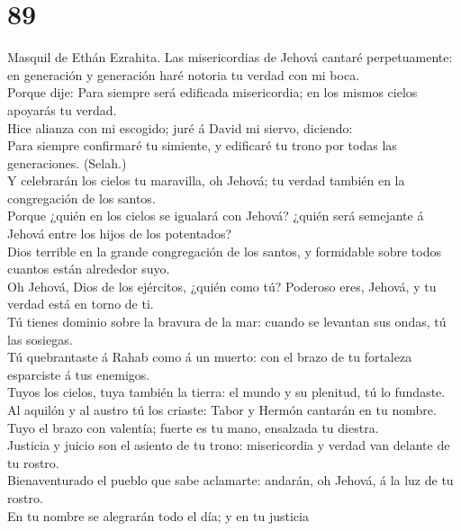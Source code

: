\hypertarget{section-19-89}{%
\section{89}\label{section-19-89}}

 Masquil de Ethán Ezrahita. Las misericordias de Jehová
cantaré perpetuamente: en generación y generación haré notoria tu verdad
con mi boca.\\
 Porque dije: Para siempre será edificada misericordia; en
los mismos cielos apoyarás tu verdad.\\
 Hice alianza con mi escogido; juré á David mi siervo,
diciendo:\\
 Para siempre confirmaré tu simiente, y edificaré tu trono
por todas las generaciones. (Selah.)\\
 Y celebrarán los cielos tu maravilla, oh Jehová; tu
verdad también en la congregación de los santos.\\
 Porque ¿quién en los cielos se igualará con Jehová?
¿quién será semejante á Jehová entre los hijos de los potentados?\\
 Dios terrible en la grande congregación de los santos, y
formidable sobre todos cuantos están alrededor suyo.\\
 Oh Jehová, Dios de los ejércitos, ¿quién como tú?
Poderoso eres, Jehová, y tu verdad está en torno de ti.\\
 Tú tienes dominio sobre la bravura de la mar: cuando se
levantan sus ondas, tú las sosiegas.\\
 Tú quebrantaste á Rahab como á un muerto: con el brazo
de tu fortaleza esparciste á tus enemigos.\\
 Tuyos los cielos, tuya también la tierra: el mundo y su
plenitud, tú lo fundaste.\\
 Al aquilón y al austro tú los criaste: Tabor y Hermón
cantarán en tu nombre.\\
 Tuyo el brazo con valentía; fuerte es tu mano, ensalzada
tu diestra.\\
 Justicia y juicio son el asiento de tu trono:
misericordia y verdad van delante de tu rostro.\\
 Bienaventurado el pueblo que sabe aclamarte: andarán, oh
Jehová, á la luz de tu rostro.\\
 En tu nombre se alegrarán todo el día; y en tu justicia
